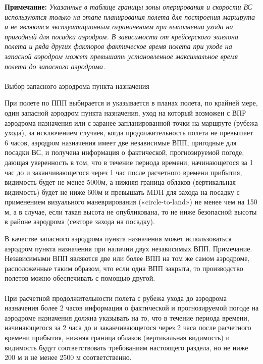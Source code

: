 \textbf{Примечание:} \textit{Указанные в таблице границы зоны оперирования и скорости ВС используются только на этапе планирования полета для построения маршрута и не являются эксплуатационным ограничением при выполнении ухода на пригодный для посадки аэродром. В зависимости от крейсерского эшелона полета и ряда других факторов фактическое время полета при уходе на запасной аэродром может превышать установленное максимальное время полета до запасного аэродрома.}

\paragraph{}{Выбор запасного аэродрома пункта назначения}\label{sect:alt}

При полете по ППП выбирается и указывается в планах полета, по крайней мере, один запасной аэродром пункта назначения, уход на который возможен с ВПР аэродрома назначения или с заранее запланированной точки на маршруте (рубежа ухода), за исключением случаев, когда продолжительность полета не превышает 6 часов, аэродром назначения имеет две независимые ВПП, пригодные для посадки ВС, и получена информация о фактической, прогнозируемой погоде, дающая уверенность в том, что в течение периода времени, начинающегося за 1 час до и заканчивающегося через 1 час после расчетного времени прибытия, видимость будет не менее 5000м, а нижняя граница облаков (вертикальная видимость) будет не ниже 600м и превышать MDH для захода на посадку с применением визуального маневрирования («circle-to-land») не менее чем на 150 м, а в случае, если такая высота не опубликована, то не ниже безопасной высоты в районе аэродрома (секторе захода на посадку).

В качестве запасного аэродрома пункта назначения может использоваться аэродром пункта назначения при наличии двух независимых ВПП.
Примечание. Независимыми ВПП являются две или более ВПП на том же самом аэродроме, расположенные таким образом, что если одна ВПП закрыта, то производство полетов можно обеспечивать с помощью другой.

\paragraph{} \label{par:alt0}При расчетной продолжительности полета с рубежа ухода до аэродрома назначения более 2 часов информация о фактической и прогнозируемой погоде на аэродроме назначения должна указывать на то, что в течение периода времени, начинающегося за 2 часа до и заканчивающегося через 2 часа после расчетного времени прибытия, нижняя граница облаков (вертикальная видимость) и видимость будут соответствовать требованиям настоящего раздела, но не ниже 200 м и не менее 2500 м соответственно.

